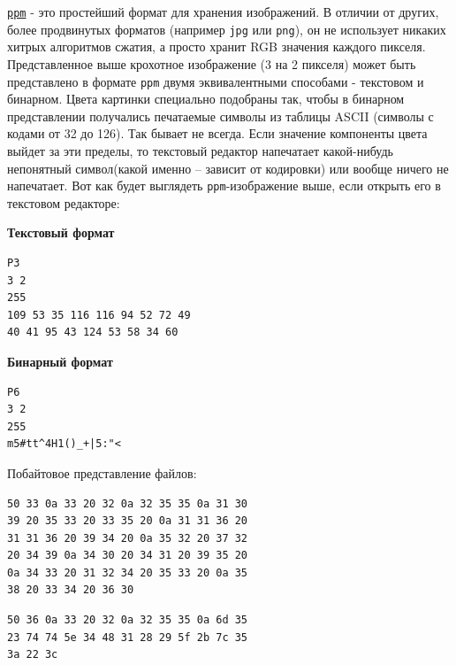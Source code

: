 \documentclass{article}
\begin{document}
\href{https://ru.wikipedia.org/wiki/Portable_anymap}{\texttt{ppm}} - это простейший формат для хранения изображений. В отличии от других, более продвинутых форматов (например \texttt{jpg} или \texttt{png}), он не использует никаких хитрых алгоритмов сжатия, а просто хранит RGB значения каждого пикселя. Представленное выше крохотное изображение (3 на 2 пикселя) может быть представлено в формате \texttt{ppm} двумя эквивалентными способами - текстовом и бинарном. Цвета картинки специально подобраны так, чтобы в бинарном представлении получались печатаемые символы из таблицы ASCII (символы с кодами от 32 до 126). Так бывает не всегда. Если значение компоненты цвета выйдет за эти пределы, то текстовый редактор напечатает какой-нибудь непонятный символ(какой именно -- зависит от кодировки) или вообще ничего не напечатает. Вот как будет выглядеть \texttt{ppm}-изображение выше, если открыть его в текстовом редакторе:\\


\begin{multicols}{2}
\textbf{Текстовый формат}\\
\begin{verbatim}
P3
3 2
255
109 53 35 116 116 94 52 72 49 
40 41 95 43 124 53 58 34 60
\end{verbatim}
\vfill\null
\columnbreak
\textbf{Бинарный формат}\\
\begin{verbatim}
P6
3 2
255
m5#tt^4H1()_+|5:"<
\end{verbatim}
\vfill\null
\end{multicols}

Побайтовое представление файлов:
\begin{multicols}{2}
\begin{verbatim}
50 33 0a 33 20 32 0a 32 35 35 0a 31 30
39 20 35 33 20 33 35 20 0a 31 31 36 20 
31 31 36 20 39 34 20 0a 35 32 20 37 32 
20 34 39 0a 34 30 20 34 31 20 39 35 20 
0a 34 33 20 31 32 34 20 35 33 20 0a 35 
38 20 33 34 20 36 30
\end{verbatim}
\vfill\null
\columnbreak
\begin{verbatim}
50 36 0a 33 20 32 0a 32 35 35 0a 6d 35
23 74 74 5e 34 48 31 28 29 5f 2b 7c 35 
3a 22 3c
\end{verbatim}
\end{multicols}
\end{document}
